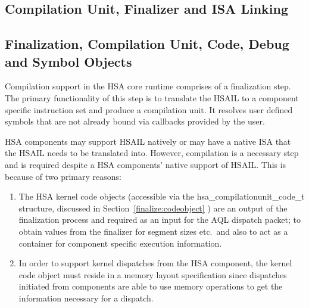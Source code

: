 \documentclass[draft]{book}
\newcommand{\reftyp}[1]{#1}
\begin{document}

%

\begin{appendices}

\chapter{Compilation Unit, Finalizer and ISA Linking}
\label{finalizerchapter} \hypertarget{finalizerchapter}{}
\hypertarget{finalizer}{}\section{Finalization, Compilation Unit,
Code, Debug and Symbol Objects}\label{finalizer}

Compilation support in the HSA core runtime comprises of a finalization
step. The primary functionality of this step is to translate the HSAIL to a
component specific instruction set and produce a compilation unit. It resolves
user defined symbols that are not already bound via callbacks provided by the
user.

HSA components may support HSAIL natively or may have a native ISA that the
HSAIL needs to be translated into. However, compilation is a necessary step and
is required despite a HSA components' native support of HSAIL. This is because
of two primary reasons:

\begin{enumerate}
\item The HSA kernel code objects (accessible via the
  \reftyp{hsa_compilationunit_code_t} structure, discussed in
  Section~\ref{finalize:codeobject} ) are an output of the finalization process
  and required as an input for the AQL dispatch packet; to obtain values from
  the finalizer for segment sizes etc.\ and also to act as a container for
  component specific execution information.

\item In order to support kernel dispatches from the HSA component, the kernel
  code object must reside in a memory layout specification since dispatches
  initiated from components are able to use memory operations to get the
  information necessary for a dispatch.
\end{enumerate}


\end{appendices}
\end{document}
